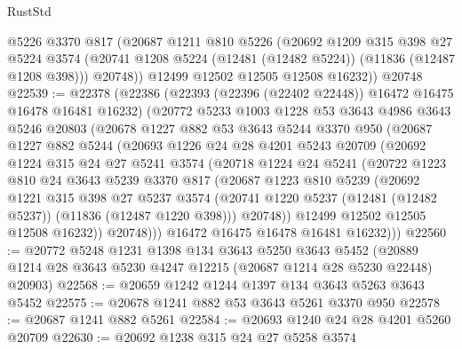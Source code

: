\begin{lexlean}{RustStd}
\begin{coremodule}
        @5226
        @3370
        @817
        (@20687
          @1211
          @810
          @5226
          (@20692
            @1209
            @315
            @398
            @27
            @5224
            @3574
            (@20741 @1208 @5224 (@12481 (@12482 @5224)) (@11836 (@12487 @1208 @398)))
            @20748))
        @12499
        @12502
        @12505
        @12508
        @16232))
    @20748
@22539 := @22378
    (@22386
      (@22393 (@22396 (@22402 @22448)) @16472 @16475 @16478 @16481 @16232)
      (@20772
        @5233
        @1003
        @1228
        @53
        @3643
        @4986
        @3643
        @5246
        @20803
        (@20678
          @1227
          @882
          @53
          @3643
          @5244
          @3370
          @950
          (@20687
            @1227
            @882
            @5244
            (@20693
              @1226
              @24
              @28
              @4201
              @5243
              @20709
              (@20692
                @1224
                @315
                @24
                @27
                @5241
                @3574
                (@20718
                  @1224
                  @24
                  @5241
                  (@20722
                    @1223
                    @810
                    @24
                    @3643
                    @5239
                    @3370
                    @817
                    (@20687
                      @1223
                      @810
                      @5239
                      (@20692
                        @1221
                        @315
                        @398
                        @27
                        @5237
                        @3574
                        (@20741 @1220 @5237 (@12481 (@12482 @5237)) (@11836 (@12487 @1220 @398)))
                        @20748))
                    @12499
                    @12502
                    @12505
                    @12508
                    @16232))
                @20748)))
          @16472
          @16475
          @16478
          @16481
          @16232)))
@22560 := @20772
    @5248
    @1231
    @1398
    @134
    @3643
    @5250
    @3643
    @5452
    (@20889 @1214 @28 @3643 @5230 @4247 @12215 (@20687 @1214 @28 @5230 @22448) @20903)
@22568 := @20659 @1242 @1244 @1397 @134 @3643 @5263 @3643 @5452
@22575 := @20678 @1241 @882 @53 @3643 @5261 @3370 @950
@22578 := @20687 @1241 @882 @5261
@22584 := @20693 @1240 @24 @28 @4201 @5260 @20709
@22630 := @20692
    @1238
    @315
    @24
    @27
    @5258
    @3574

\end{coremodule}
\end{lexlean}
